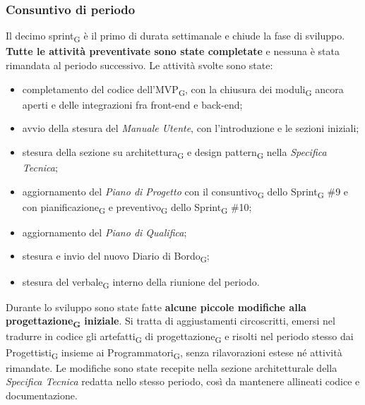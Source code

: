 ﻿\documentclass[a4paper, 10pt, colorlinks=true, linkcolor=black, urlcolor=blue, citecolor=blue, hidelinks]{article}
\begin{document}
\subsubsection{Consuntivo di periodo}
Il decimo sprint\textsubscript{G} è il primo di durata settimanale e chiude la fase di sviluppo. \textbf{Tutte le attività preventivate sono state completate} e nessuna è stata rimandata al periodo successivo. Le attività svolte sono state:
\begin{itemize}
    \item completamento del codice dell'MVP\textsubscript{G}, con la chiusura dei moduli\textsubscript{G} ancora aperti e delle integrazioni fra front-end e back-end;

    \item avvio della stesura del \textit{Manuale Utente}, con l'introduzione e le sezioni iniziali;

    \item stesura della sezione su architettura\textsubscript{G} e design pattern\textsubscript{G} nella \textit{Specifica Tecnica};

    \item aggiornamento del \textit{Piano di Progetto} con il consuntivo\textsubscript{G} dello Sprint\textsubscript{G} \#9 e con pianificazione\textsubscript{G} e preventivo\textsubscript{G} dello Sprint\textsubscript{G} \#10;

    \item aggiornamento del \textit{Piano di Qualifica};

    \item stesura e invio del nuovo Diario di Bordo\textsubscript{G};

    \item stesura del verbale\textsubscript{G} interno della riunione del periodo.
\end{itemize}

Durante lo sviluppo sono state fatte \textbf{alcune piccole modifiche alla progettazione\textsubscript{G} iniziale}. Si tratta di aggiustamenti circoscritti, emersi nel tradurre in codice gli artefatti\textsubscript{G} di progettazione\textsubscript{G} e risolti nel periodo stesso dai Progettisti\textsubscript{G} insieme ai Programmatori\textsubscript{G}, senza rilavorazioni estese né attività rimandate. Le modifiche sono state recepite nella sezione architetturale della \textit{Specifica Tecnica} redatta nello stesso periodo, così da mantenere allineati codice e documentazione.
\end{document}
